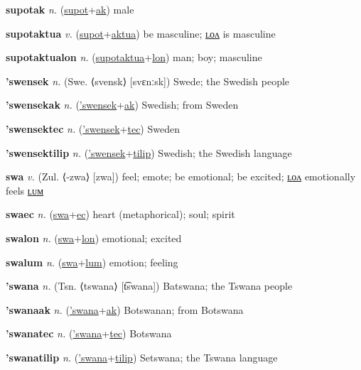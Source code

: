 \textbf{\hypertarget{supotak}{supotak}} \textit{n.} (\hyperlink{supot}{supot}+\allowbreak \hyperlink{ak}{ak})
male

\textbf{\hypertarget{supotaktua}{supotaktua}} \textit{v.} (\hyperlink{supot}{supot}+\allowbreak \hyperlink{aktua}{aktua})
be masculine; \hyperlink{supotaktualon}{ʟᴏᴧ} is masculine

\textbf{\hypertarget{supotaktualon}{supotaktualon}} \textit{n.} (\hyperlink{supotaktua}{supotaktua}+\allowbreak \hyperlink{lon}{lon})
man; boy; masculine

\textbf{\hypertarget{'swensek}{'swensek}} \textit{n.} (Swe. ⟨svensk⟩ [svɛnːsk])
Swede; the Swedish people

\textbf{\hypertarget{'swensekak}{'swensekak}} \textit{n.} (\hyperlink{'swensek}{'swensek}+\allowbreak \hyperlink{ak}{ak})
Swedish; from Sweden

\textbf{\hypertarget{'swensektec}{'swensektec}} \textit{n.} (\hyperlink{'swensek}{'swensek}+\allowbreak \hyperlink{tec}{tec})
Sweden

\textbf{\hypertarget{'swensektilip}{'swensektilip}} \textit{n.} (\hyperlink{'swensek}{'swensek}+\allowbreak \hyperlink{tilip}{tilip})
Swedish; the Swedish language

\textbf{\hypertarget{swa}{swa}} \textit{v.} (Zul. ⟨-zwa⟩ [zwa])
feel; emote; be emotional; be excited; \hyperlink{swalon}{ʟᴏᴧ} emotionally feels \hyperlink{swalum}{ʟᴜᴍ}

\textbf{\hypertarget{swaec}{swaec}} \textit{n.} (\hyperlink{swa}{swa}+\allowbreak \hyperlink{ec}{ec})
heart (metaphorical); soul; spirit

\textbf{\hypertarget{swalon}{swalon}} \textit{n.} (\hyperlink{swa}{swa}+\allowbreak \hyperlink{lon}{lon})
emotional; excited

\textbf{\hypertarget{swalum}{swalum}} \textit{n.} (\hyperlink{swa}{swa}+\allowbreak \hyperlink{lum}{lum})
emotion; feeling

\textbf{\hypertarget{'swana}{'swana}} \textit{n.} (Tsn. ⟨tswana⟩ [t͡swana])
Batswana; the Tswana people

\textbf{\hypertarget{'swanaak}{'swanaak}} \textit{n.} (\hyperlink{'swana}{'swana}+\allowbreak \hyperlink{ak}{ak})
Botswanan; from Botswana

\textbf{\hypertarget{'swanatec}{'swanatec}} \textit{n.} (\hyperlink{'swana}{'swana}+\allowbreak \hyperlink{tec}{tec})
Botswana

\textbf{\hypertarget{'swanatilip}{'swanatilip}} \textit{n.} (\hyperlink{'swana}{'swana}+\allowbreak \hyperlink{tilip}{tilip})
Setswana; the Tswana language

